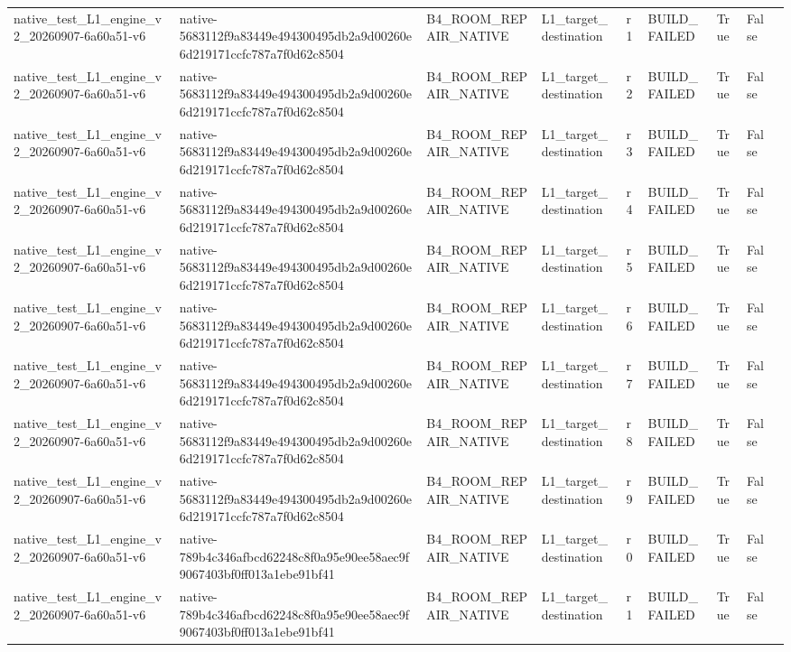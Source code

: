 \begin{tabular}{lllllllll}
native\_test\_L1\_engine\_v2\_20260907-6a60a51-v6 & native-5683112f9a83449e494300495db2a9d00260e6d219171ccfc787a7f0d62c8504 & B4\_ROOM\_REPAIR\_NATIVE & L1\_target\_destination & r1 & BUILD\_FAILED & True & False &  \\
native\_test\_L1\_engine\_v2\_20260907-6a60a51-v6 & native-5683112f9a83449e494300495db2a9d00260e6d219171ccfc787a7f0d62c8504 & B4\_ROOM\_REPAIR\_NATIVE & L1\_target\_destination & r2 & BUILD\_FAILED & True & False &  \\
native\_test\_L1\_engine\_v2\_20260907-6a60a51-v6 & native-5683112f9a83449e494300495db2a9d00260e6d219171ccfc787a7f0d62c8504 & B4\_ROOM\_REPAIR\_NATIVE & L1\_target\_destination & r3 & BUILD\_FAILED & True & False &  \\
native\_test\_L1\_engine\_v2\_20260907-6a60a51-v6 & native-5683112f9a83449e494300495db2a9d00260e6d219171ccfc787a7f0d62c8504 & B4\_ROOM\_REPAIR\_NATIVE & L1\_target\_destination & r4 & BUILD\_FAILED & True & False &  \\
native\_test\_L1\_engine\_v2\_20260907-6a60a51-v6 & native-5683112f9a83449e494300495db2a9d00260e6d219171ccfc787a7f0d62c8504 & B4\_ROOM\_REPAIR\_NATIVE & L1\_target\_destination & r5 & BUILD\_FAILED & True & False &  \\
native\_test\_L1\_engine\_v2\_20260907-6a60a51-v6 & native-5683112f9a83449e494300495db2a9d00260e6d219171ccfc787a7f0d62c8504 & B4\_ROOM\_REPAIR\_NATIVE & L1\_target\_destination & r6 & BUILD\_FAILED & True & False &  \\
native\_test\_L1\_engine\_v2\_20260907-6a60a51-v6 & native-5683112f9a83449e494300495db2a9d00260e6d219171ccfc787a7f0d62c8504 & B4\_ROOM\_REPAIR\_NATIVE & L1\_target\_destination & r7 & BUILD\_FAILED & True & False &  \\
native\_test\_L1\_engine\_v2\_20260907-6a60a51-v6 & native-5683112f9a83449e494300495db2a9d00260e6d219171ccfc787a7f0d62c8504 & B4\_ROOM\_REPAIR\_NATIVE & L1\_target\_destination & r8 & BUILD\_FAILED & True & False &  \\
native\_test\_L1\_engine\_v2\_20260907-6a60a51-v6 & native-5683112f9a83449e494300495db2a9d00260e6d219171ccfc787a7f0d62c8504 & B4\_ROOM\_REPAIR\_NATIVE & L1\_target\_destination & r9 & BUILD\_FAILED & True & False &  \\
native\_test\_L1\_engine\_v2\_20260907-6a60a51-v6 & native-789b4c346afbcd62248c8f0a95e90ee58aec9f9067403bf0ff013a1ebe91bf41 & B4\_ROOM\_REPAIR\_NATIVE & L1\_target\_destination & r0 & BUILD\_FAILED & True & False &  \\
native\_test\_L1\_engine\_v2\_20260907-6a60a51-v6 & native-789b4c346afbcd62248c8f0a95e90ee58aec9f9067403bf0ff013a1ebe91bf41 & B4\_ROOM\_REPAIR\_NATIVE & L1\_target\_destination & r1 & BUILD\_FAILED & True & False &  \\

\end{tabular}
